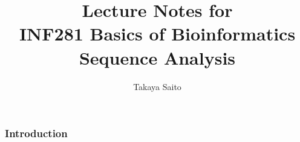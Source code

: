 \documentclass[12pt]{article}
\title{Lecture Notes for \\ INF281 Basics of Bioinformatics Sequence Analysis}
\author{Takaya Saito}
\date{}
\begin{document}
\setcounter{page}{1}

\makeatletter 
\renewcommand{\thefigure}{\arabic{section}.\arabic{figure}}
\renewcommand{\thetable}{\arabic{section}.\arabic{table}}
\makeatother

%
%
\part{}

%
%
\setcounter{figure}{0}
\section{Introduction}



\end{document}
